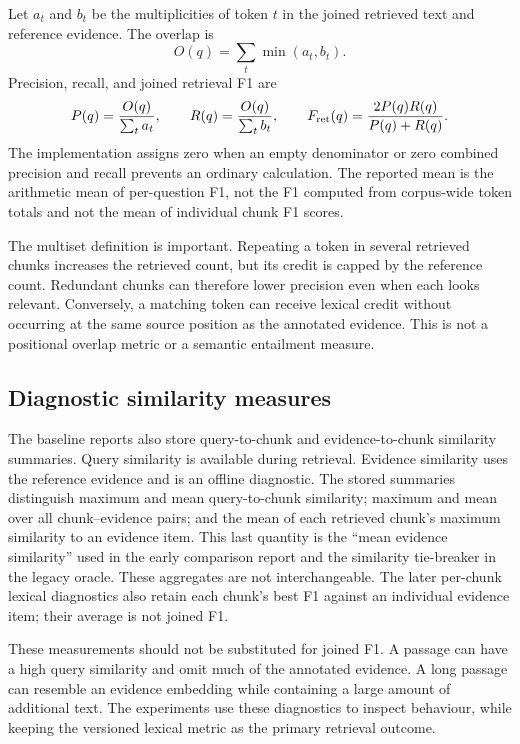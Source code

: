 Let $a_t$ and $b_t$ be the multiplicities of token $t$ in the joined
retrieved text and reference evidence. The overlap is
\begin{equation}
O(q)=\sum_t\min(a_t,b_t).
\end{equation}
Precision, recall, and joined retrieval F1 are
\begin{equation}
P(q)=\frac{O(q)}{\sum_t a_t},\qquad
R(q)=\frac{O(q)}{\sum_t b_t},\qquad
F_{\mathrm{ret}}(q)=\frac{2P(q)R(q)}{P(q)+R(q)}.
\label{eq:retrievalmetric}
\end{equation}
The implementation assigns zero when an empty denominator or zero
combined precision and recall prevents an ordinary calculation.
The reported mean is the arithmetic mean of per-question F1, not
the F1 computed from corpus-wide token totals and not the mean of
individual chunk F1 scores.

The multiset definition is important. Repeating a token in several
retrieved chunks increases the retrieved count, but its credit is
capped by the reference count. Redundant chunks can therefore lower
precision even when each looks relevant. Conversely, a matching token
can receive lexical credit without occurring at the same source
position as the annotated evidence. This is not a positional overlap
metric or a semantic entailment measure.

\subsection{Diagnostic similarity measures}
The baseline reports also store query-to-chunk and evidence-to-chunk
similarity summaries. Query similarity is available during retrieval.
Evidence similarity uses the reference evidence and is an offline
diagnostic. The stored summaries distinguish maximum and mean
query-to-chunk similarity; maximum and mean over all chunk--evidence
pairs; and the mean of each retrieved chunk's maximum similarity to an
evidence item. This last quantity is the \enquote{mean evidence
similarity} used in the early comparison report and the similarity
tie-breaker in the legacy oracle. These aggregates are not interchangeable.
The later per-chunk lexical diagnostics also retain each chunk's best
F1 against an individual evidence item; their average is not joined F1.

These measurements should not be substituted for joined F1. A passage
can have a high query similarity and omit much of the annotated evidence.
A long passage can resemble an evidence embedding while containing a
large amount of additional text. The experiments use these diagnostics
to inspect behaviour, while keeping the versioned lexical metric as
the primary retrieval outcome.

